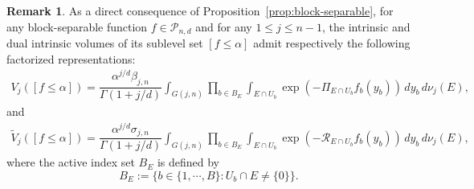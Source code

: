 \documentclass[11pt]{article}
\theoremstyle{definition}
\numberwithin{equation}{section}
\newtheorem{remark}[theorem]{Remark}
\begin{document}
\begin{remark}\normalfont
As a direct consequence of Proposition~\ref{prop:block-separable},  
for any block-separable function $f \in \mathcal P_{n,d}$ and for any $1 \le j \le n-1$,  
the intrinsic and dual intrinsic volumes of its sublevel set $[f \le \alpha]$ admit respectively the following factorized representations:
\begin{align*}
    V_j([f \leq \alpha]) = \dfrac{\alpha^{j/d}\beta_{j, n}}{\Gamma(1 + j/d)} \int_{G(j, n)} \prod_{b \in B_E} \int_{E \cap U_b} \exp(- \Pi_{E \cap U_b} f_b(y_b)) \, dy_b \, d\nu_j(E),
\end{align*}
and 
\begin{align*}
    \widetilde V_j([f \leq \alpha]) = \dfrac{\alpha^{j/d}\sigma_{j, n}}{\Gamma(1 + j/d)} \int_{G(j, n)} \prod_{b \in B_E} \int_{E \cap U_b} \exp(- \mathscr R_{E \cap U_b} f_b(y_b)) \, dy_b \, d\nu_j(E),
\end{align*}
where the active index set $B_E$ is defined by
\[
    B_E := \{ b \in \{1, \cdots, B \}: U_b \cap E \neq \{ 0 \} \}.
\]
\end{remark}
\end{document}
